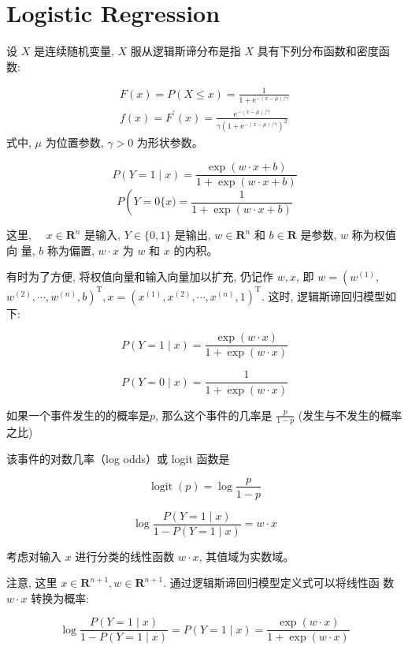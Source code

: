 \chapter{Logistic Regression}

\begin{definition}
    设 $ X $ 是连续随机变量, $ X $ 服从逻辑斯谛分布是指 $ X $ 具有下列分布函数和密度函数:

    $$
\begin{array}{l}
F(x)=P(X \leqslant x)=\frac{1}{1+\mathrm{e}^{-(x-\mu) / \gamma}} \\
f(x)=F^{\prime}(x)=\frac{\mathrm{e}^{-(x-\mu) / \gamma}}{\gamma\left(1+\mathrm{e}^{-(x-\mu) / \gamma}\right)^{2}}
\end{array}
$$
式中, $ \mu $ 为位置参数, $ \gamma>0 $ 为形状参数。
\end{definition}



\begin{definition}
    $$ P(Y=1 \mid x)=\frac{\exp (w \cdot x+b)}{1+\exp (w \cdot x+b)} $$
$$ P\left(Y=0\{x)=\frac{1}{1+\exp (w \cdot x+b)}\right. $$

这里, $\quad x \in \mathbf{R}^{n}$ 是输入, $Y \in\{0,1\}$ 是输出, $w \in \mathbf{R}^{n}$ 和 $b \in \mathbf{R}$ 是参数, $w$ 称为权值向 量, $b$ 称为偏置, $w \cdot x$ 为 $w$ 和 $x$ 的内积。
\end{definition}

有时为了方便, 将权值向量和输入向量加以扩充, 仍记作 $ w, x $, 即 $ w=\left(w^{(1)}\right. $, $ \left.w^{(2)}, \cdots, w^{(n)}, b\right)^{\mathrm{T}}, x=\left(x^{(1)}, x^{(2)}, \cdots, x^{(n)}, 1\right)^{\mathrm{T}} $. 这时, 逻辑斯谛回归模型如下:

$$ P(Y=1 \mid x)=\frac{\exp (w \cdot x)}{1+\exp (w \cdot x)} $$

$$ P(Y=0 \mid x)=\frac{1}{1+\exp (w \cdot x)} $$

\begin{definition}[几率]
    如果一个事件发生的的概率是$p$, 那么这个事件的几率是 $ \frac{p}{1-p} $ (发生与不发生的概率之比)
\end{definition}

该事件的对数几率（log odds）或 logit 函数是

$$ \operatorname{logit}(p)=\log \frac{p}{1-p} $$

$$ \log \frac{P(Y=1 \mid x)}{1-P(Y=1 \mid x)}=w \cdot x $$

考虑对输入 $ x $ 进行分类的线性函数 $ w \cdot x $, 其值域为实数域。

注意, 这里 $ x \in \mathbf{R}^{n+1}, w \in \mathbf{R}^{n+1} $. 通过逻辑斯谛回归模型定义式可以将线性函 数 $ w \cdot x $ 转换为概率:

$$\log \frac{P(Y=1 \mid x)}{1-P(Y=1 \mid x)}= P(Y=1 \mid x)=\frac{\exp (w \cdot x)}{1+\exp (w \cdot x)} $$